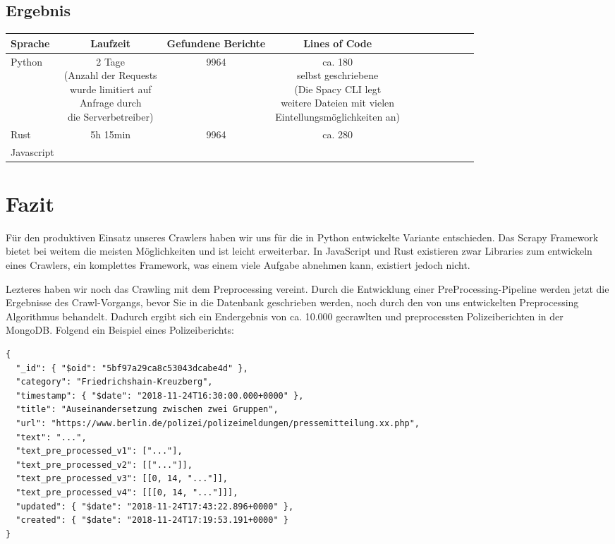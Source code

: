 \subsection{Ergebnis}

\begin{tabular}{| l | c | c | c | c | c | c | c | c | c | c |}
	\hline
	Sprache    & Laufzeit & Gefundene Berichte & Lines of Code\\
	\hline
	Python     & \makecell{2 Tage \\ (Anzahl der Requests \\ wurde limitiert auf  \\ Anfrage durch \\ die Serverbetreiber)} & 9964 &  \makecell{ca. 180 \\ selbst geschriebene  \\ (Die Spacy CLI legt \\ weitere Dateien mit vielen \\ Eintellungsmöglichkeiten an)} \\
	\hline
	Rust       & 5h 15min & 9964 & ca. 280 \\
	\hline
	Javascript & & &\\
	\hline
\end{tabular}


\section{Fazit}
Für den produktiven Einsatz unseres Crawlers haben wir uns für die in Python entwickelte Variante entschieden.
Das Scrapy Framework bietet bei weitem die meisten Möglichkeiten und ist leicht erweiterbar.
In JavaScript und Rust existieren zwar Libraries zum entwickeln eines Crawlers, ein komplettes Framework, was einem
viele Aufgabe abnehmen kann, existiert jedoch nicht.

Lezteres haben wir noch das Crawling mit dem Preprocessing vereint. Durch die Entwicklung einer PreProcessing-Pipeline
werden jetzt die Ergebnisse des Crawl-Vorgangs, bevor Sie in die Datenbank geschrieben werden, noch durch den von uns
entwickelten Preprocessing Algorithmus behandelt. Dadurch ergibt sich ein Endergebnis von ca. 10.000 gecrawlten und preprocessten
Polizeiberichten in der MongoDB. Folgend ein Beispiel eines Polizeiberichts:

\begin{verbatim}
{
  "_id": { "$oid": "5bf97a29ca8c53043dcabe4d" },
  "category": "Friedrichshain-Kreuzberg",
  "timestamp": { "$date": "2018-11-24T16:30:00.000+0000" },
  "title": "Auseinandersetzung zwischen zwei Gruppen",
  "url": "https://www.berlin.de/polizei/polizeimeldungen/pressemitteilung.xx.php",
  "text": "...",
  "text_pre_processed_v1": ["..."],
  "text_pre_processed_v2": [["..."]],
  "text_pre_processed_v3": [[0, 14, "..."]],
  "text_pre_processed_v4": [[[0, 14, "..."]]],
  "updated": { "$date": "2018-11-24T17:43:22.896+0000" },
  "created": { "$date": "2018-11-24T17:19:53.191+0000" }
}
\end{verbatim}
